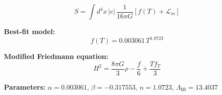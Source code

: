 
\begin{equation}
  S = \int d^4x \, |e| \, \frac{1}{16\pi G} \left[ f(T) + \mathcal{L}_m \right]
\end{equation}

\textbf{Best-fit model:}
\begin{equation}
  f(T) = 0.003061 \, T^{1.0723}
\end{equation}

\textbf{Modified Friedmann equation:}
\begin{equation}
  H^2 = \frac{8\pi G}{3} \rho - \frac{f}{6} + \frac{T f_T}{3}
\end{equation}

\textbf{Parameters:}
$\alpha = 0.003061$, \quad
$\beta = -0.317553$, \quad
$n = 1.0723$, \quad
$\Lambda_{\text{BI}} = 13.4037$